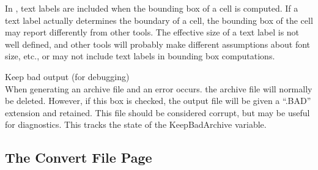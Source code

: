 \begin{description}
In {\Xic}, text labels are included when the bounding box of a cell is
computed.  If a text label actually determines the boundary of a cell,
the bounding box of the cell may report differently from other tools. 
The effective size of a text label is not well defined, and other
tools will probably make different assumptions about font size, etc.,
or may not include text labels in bounding box computations.

\item{\cb Keep bad output (for debugging)}\\
When generating an archive file and an error occurs.  the archive file
will normally be deleted.  However, if this box is checked, the output
file will be given a ``{\vt .BAD}'' extension and retained.  This file
should be considered corrupt, but may be useful for diagnostics.  This
tracks the state of the {\et KeepBadArchive} variable.
\end{description}

\subsection{The Convert File Page}

